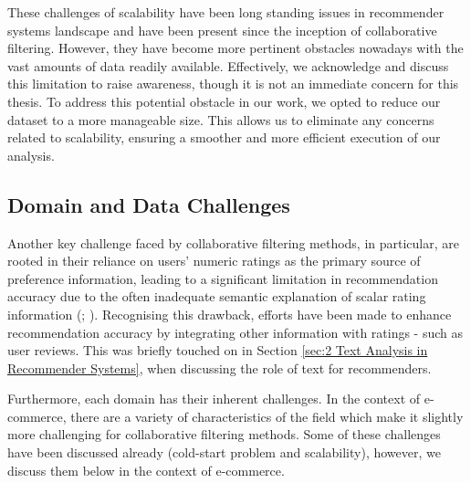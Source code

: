 These challenges of scalability have been long standing issues in recommender systems landscape and have been present since the inception of collaborative filtering. However, they have become more pertinent obstacles nowadays with the vast amounts of data readily available. Effectively, we acknowledge and discuss this limitation to raise awareness, though it is not an immediate concern for this thesis. To address this potential obstacle in our work, we opted to reduce our dataset to a more manageable size. This allows us to eliminate any concerns related to scalability, ensuring a smoother and more efficient execution of our analysis.

\subsection{Domain and Data Challenges}
\label{subsec: Domain and Data Challenges}

Another key challenge faced by collaborative filtering methods, in particular, are rooted in their reliance on users' numeric ratings as the primary source of preference information, leading to a significant limitation in recommendation accuracy due to the often inadequate semantic explanation of scalar rating information (\cite{leino2007case}; \cite{shoja2019customer}). Recognising this drawback, efforts have been made to enhance recommendation accuracy by integrating other information with ratings - such as user reviews. This was briefly touched on in Section \ref{sec:2 Text Analysis in Recommender Systems}, when discussing the role of text for recommenders.

Furthermore, each domain has their inherent  challenges. In the context of e-commerce, there are a variety of characteristics of the field which make it slightly more challenging for collaborative filtering methods. Some of these challenges have been discussed already (cold-start problem and scalability), however, we discuss them below in the context of e-commerce.

